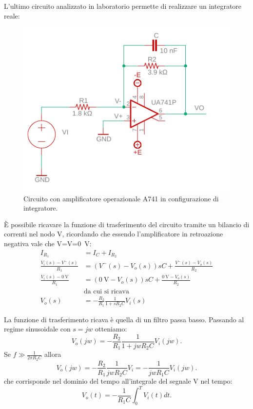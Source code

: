 L'ultimo circuito analizzato in laboratorio permette di realizzare un integratore reale:
\begin{figure}[h!]
	\centering
	\includegraphics[width=0.7\linewidth]{./OtherFiles/Laboratorio 4/opam_int}
	\caption{Circuito con amplificatore operazionale \textmu A741 in configurazione di integratore.}
	\label{fig:opamp_int}
\end{figure}

\`E possibile ricavare la funzione di trasferimento del circuito tramite un bilancio di correnti nel nodo V\super{-}, ricordando che essendo l'amplificatore in retroazione negativa vale che V\super{+}=V\super{-}=\SI{0}{\volt}:
\begin{equation}
	\begin{split}
		I_{R_1}&=I_{C}+I_{R_2} \\
		\frac{V_i(s)-V^-(s)}{R_1}&=(V^-(s)-V_o(s))sC+\frac{V^-(s)-V_o(s)}{R_2} \\
		\frac{V_i(s)-\SI{0}{\volt}}{R_1}&=(\SI{0}{\volt}-V_o(s))sC+\frac{\SI{0}{\volt}-V_o(s)}{R_2} \\
		&\text{da cui si ricava} \\
		V_o(s)&=-\frac{R_2}{R_1}\frac{1}{1+sR_2C}V_i(s)
	\end{split}
\end{equation}

La funzione di trasferimento ricava è quella di un filtro passa basso. Passando al regime sinusoidale con $s=jw$ otteniamo:
\begin{equation}
	V_o(jw)=-\frac{R_2}{R_1}\frac{1}{1+jwR_2C}V_i(jw).
\end{equation}
Se $f\gg\frac{1}{2\pi R_2C}$ allora 
\begin{equation}
	V_o(jw)=-\frac{R_2}{R_1}\frac{1}{jwR_2C}V_i=-\frac{1}{jwR_1C}V_i(jw).
\end{equation}
che corrisponde nel dominio del tempo all'integrale del segnale V nel tempo:
\begin{equation}
	V_o(t)=-\frac{1}{R_1C}\int_0^TV_i(t) dt.
\end{equation}

